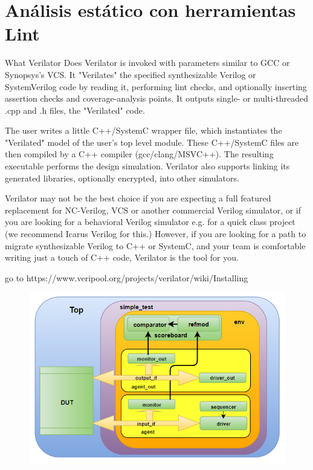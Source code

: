 \documentclass{article}
\begin{document}
\section{Análisis estático con herramientas Lint}

 What Verilator Does
Verilator is invoked with parameters similar to GCC or Synopsys’s VCS. It "Verilates" the specified synthesizable Verilog or SystemVerilog code by reading it, performing lint checks, and optionally inserting assertion checks and coverage-analysis points. It outputs single- or multi-threaded .cpp and .h files, the "Verilated" code.

The user writes a little C++/SystemC wrapper file, which instantiates the "Verilated" model of the user’s top level module. These C++/SystemC files are then compiled by a C++ compiler (gcc/clang/MSVC++). The resulting executable performs the design simulation. Verilator also supports linking its generated libraries, optionally encrypted, into other simulators.

Verilator may not be the best choice if you are expecting a full featured replacement for NC-Verilog, VCS or another commercial Verilog simulator, or if you are looking for a behavioral Verilog simulator e.g. for a quick class project (we recommend Icarus Verilog for this.) However, if you are looking for a path to migrate synthesizable Verilog to C++ or SystemC, and your team is comfortable writing just a touch of C++ code, Verilator is the tool for you.

go to https://www.veripool.org/projects/verilator/wiki/Installing

  \begin{figure}[h]
    \includegraphics[width=0.6\linewidth]{pictures/uvm.png}
    \label{uvm_tb}
  \end{figure}
		
\newpage


\end{document}
